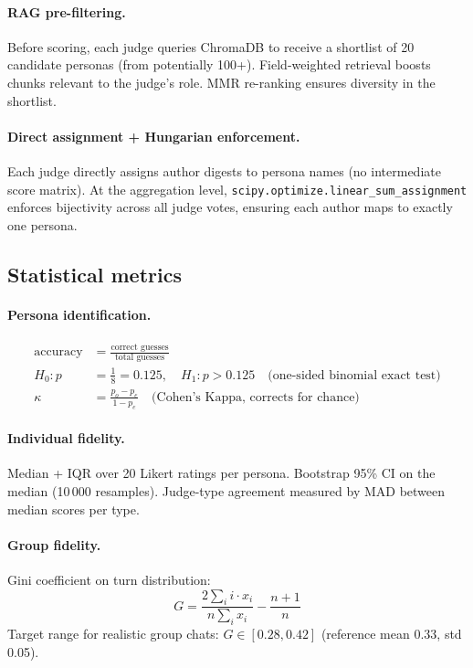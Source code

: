 \documentclass[12pt,a4paper]{article}
\begin{document}
\paragraph{RAG pre-filtering.}
Before scoring, each judge queries ChromaDB to receive a shortlist of 20 candidate personas
(from potentially 100+). Field-weighted retrieval boosts chunks relevant to the judge's role.
MMR re-ranking ensures diversity in the shortlist.

\paragraph{Direct assignment + Hungarian enforcement.}
Each judge directly assigns author digests to persona names (no intermediate score matrix).
At the aggregation level, \texttt{scipy.optimize.linear\_sum\_assignment} enforces
bijectivity across all judge votes, ensuring each author maps to exactly one persona.

\subsection{Statistical metrics}

\paragraph{Persona identification.}
\begin{align}
\text{accuracy} &= \frac{\text{correct guesses}}{\text{total guesses}} \\
H_0: p &= \tfrac{1}{8} = 0.125, \quad H_1: p > 0.125 \quad \text{(one-sided binomial exact test)} \\
\kappa &= \frac{p_o - p_e}{1 - p_e} \quad \text{(Cohen's Kappa, corrects for chance)}
\end{align}

\paragraph{Individual fidelity.}
Median + IQR over 20 Likert ratings per persona. Bootstrap 95\% CI on the median
(10\,000 resamples). Judge-type agreement measured by MAD between median scores per type.

\paragraph{Group fidelity.}
Gini coefficient on turn distribution:
\[
G = \frac{2 \sum_i i \cdot x_i}{n \sum_i x_i} - \frac{n+1}{n}
\]
Target range for realistic group chats: $G \in [0.28, 0.42]$ (reference mean 0.33, std 0.05).
\end{document}
